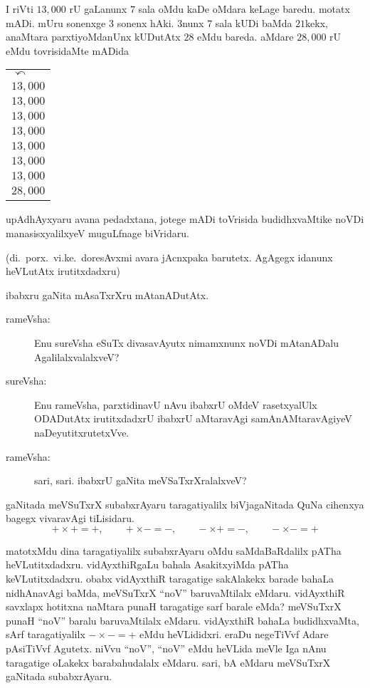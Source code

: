 \noindent
\begin{minipage}[c]{5.5cm}
I riVti $13,000$ rU gaLanunx $7$ sala oMdu kaDe oMdara keLage baredu. motatx mADi. mUru sonenxge $3$ sonenx hAki. $3$nunx $7$ sala kUDi baMda $21$kekx, anaMtara parxtiyoMdanUnx kUDutAtx $28$ eMdu bareda. aMdare $28,000$ rU eMdu tovrisidaMte mADida
\end{minipage}
\quad
\begin{minipage}[c]{4cm}
\begin{center}
\begin{tabular}{l}
$\curvearrowleft$\\
$13,000$\\
$13,000$\\
$13,000$\\
$13,000$\\
$13,000$\\
$13,000$\\
$13,000$\\
\hline
$28,000$
\end{tabular}
\end{center}
\end{minipage}

\smallskip

upAdhAyxyaru avana pedadxtana, jotege mADi toVrisida budidhxvaMtike noVDi manasisxyalilxyeV muguLfnage biVridaru.

(di.\ porx.\ vi.ke.\ doresAvxmi avara jAcnxpaka barutetx. AgAgegx idanunx heVLutAtx irutitxdadxru)

\medskip

ibabxru gaNita mAsaTxrXru mAtanADutAtx.
\begin{description}
\item[rameVsha:] Enu sureVsha eSuTx divasavAyutx nimamxnunx noVDi mAtanADalu AgalilalxvalalxveV?

\item[sureVsha:] Enu rameVsha, parxtidinavU nAvu ibabxrU oMdeV rasetxyalUlx ODADutAtx irutitxdadxrU ibabxrU aMtaravAgi samAnAMtaravAgiyeV naDeyutitxrutetxVve.

\item[rameVsha:] sari, sari. ibabxrU gaNita meVSaTxrXralalxveV?
\end{description}

\medskip
gaNitada meVSuTxrX subabxrAyaru taragatiyalilx biVjagaNitada QuNa cihenxya bagegx vivaravAgi tiLisidaru.
$$
+\times+=+,\qquad +\times-=-,\qquad -\times+=-,\qquad -\times -=+
$$

matotxMdu dina taragatiyalilx subabxrAyaru oMdu saMdaBaRdalilx pATha heVLutitxdadxru. vidAyxthiRgaLu bahala AsakitxyiMda pATha keVLutitxdadxru. obabx vidAyxthiR taragatige sakAlakekx barade bahaLa nidhAnavAgi baMda, meVSuTxrX ``noV'' baruvaMtilalx eMdaru. vidAyxthiR savxlapx hotitxna naMtara punaH taragatige sarf barale eMda? meVSuTxrX punaH ``noV'' baralu baruvaMtilalx eMdaru. vidAyxthiR bahaLa budidhxvaMta, sArf taragatiyalilx $-\times-=+$ eMdu heVLididxri. eraDu negeTiVvf Adare pAsiTiVvf Agutetx. niVvu ``noV'', ``noV'' eMdu heVLida meVle Iga nAnu taragatige oLakekx barabahudalalx eMdaru. sari, bA eMdaru meVSuTxrX gaNitada subabxrAyaru.

